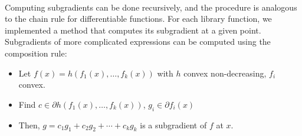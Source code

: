 \\
Computing subgradients can be done recursively, and the procedure is analogous to the chain rule for differentiable functions. For each library function, we implemented a method that computes its subgradient at a given point. Subgradients of more complicated expressions can be computed using the composition rule:
\begin{itemize}
\item Let $f(x) = h(f_1(x), \ldots, f_k(x))$ with $h$ convex non-decreasing,
  $f_i$ convex.
\item Find $c \in \partial h(f_1(x), \ldots, f_k(x))$,  $g_i \in \partial
  f_i(x)$
\item Then, $g = c_1 g_1 + c_2 g_2 + \cdots + c_k g_k$ is a subgradient of $f$ at $x$.
\end{itemize}
